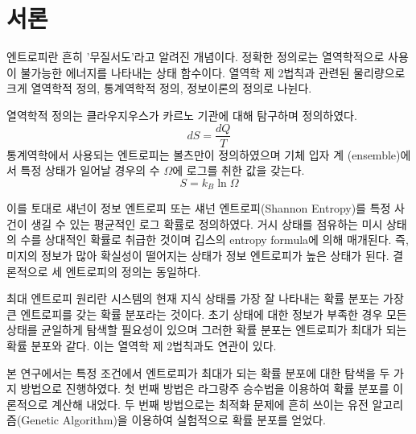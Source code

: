 \section{서론}

엔트로피란 흔히 '무질서도'라고 알려진 개념이다. 정확한 정의로는 열역학적으로 사용이 불가능한 에너지를 나타내는 상태 함수이다. 열역학 제 2법칙과 관련된 물리량으로 크게 열역학적 정의, 통계역학적 정의, 정보이론의 정의로 나뉜다.

열역학적 정의는 클라우지우스가 카르노 기관에 대해 탐구하며 정의하였다.
\begin{equation}
    dS = \frac{dQ}{T}
\end{equation}
통계역학에서 사용되는 엔트로피는 볼츠만이 정의하였으며 기체 입자 계 (ensemble)에서 특정 상태가 일어날 경우의 수 $\Omega$에 로그를 취한 값을 갖는다.
\begin{equation}
    S = k_{B} \ln{\Omega}
\end{equation}

이를 토대로 섀넌이 정보 엔트로피 또는 섀넌 엔트로피(Shannon Entropy)를 특정 사건이 생길 수 있는 평균적인 로그 확률로 정의하였다. 거시 상태를 점유하는 미시 상태의 수를 상대적인 확률로 취급한 것이며 깁스의 entropy formula에 의해 매개된다. 즉, 미지의 정보가 많아 확실성이 떨어지는 상태가 정보 엔트로피가 높은 상태가 된다. 결론적으로 세 엔트로피의 정의는 동일하다.

최대 엔트로피 원리란 시스템의 현재 지식 상태를 가장 잘 나타내는 확률 분포는 가장 큰 엔트로피를 갖는 확률 분포라는 것이다. 초기 상태에 대한 정보가 부족한 경우 모든 상태를 균일하게 탐색할 필요성이 있으며 그러한 확률 분포는 엔트로피가 최대가 되는 확률 분포와 같다. 이는 열역학 제 2법칙과도 연관이 있다.

본 연구에서는 특정 조건에서 엔트로피가 최대가 되는 확률 분포에 대한 탐색을 두 가지 방법으로 진행하였다. 첫 번째 방법은 라그랑주 승수법을 이용하여 확률 분포를 이론적으로 계산해 내었다. 두 번째 방법으로는 최적화 문제에 흔히 쓰이는 유전 알고리즘(Genetic Algorithm)을 이용하여 실험적으로 확률 분포를 얻었다.